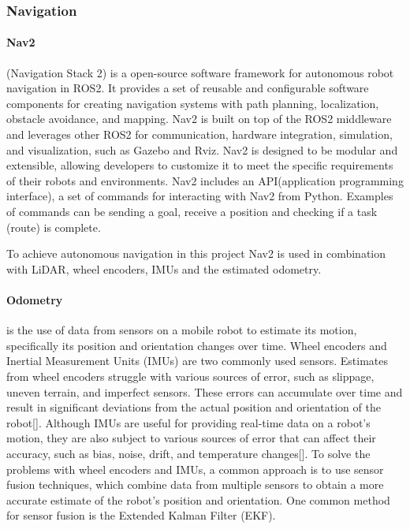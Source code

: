 \subsubsection{Navigation} 

\paragraph{Nav2} (Navigation Stack 2) \cite{rosnavigation} is a open-source software framework for autonomous robot navigation in ROS2. It provides a set of reusable and configurable software components for creating navigation systems with path planning, localization, obstacle avoidance, and mapping. Nav2 is built on top of the ROS2 middleware and leverages other ROS2 for communication, hardware integration, simulation, and visualization, such as Gazebo and Rviz. Nav2 is designed to be modular and extensible, allowing developers to customize it to meet the specific requirements of their robots and environments.
Nav2 includes an API(application programming interface)\cite{rosnavAPI}, a set of commands for interacting with Nav2 from Python. Examples of commands can be sending a goal, receive a position and checking if a task (route) is complete.  

To achieve autonomous navigation in this project Nav2 is used in combination with LiDAR, wheel encoders, IMUs and the estimated odometry. 

\paragraph{Odometry} is the use of data from sensors on a mobile robot to estimate its motion, specifically its position and orientation changes over time. Wheel encoders and Inertial Measurement Units (IMUs) are two commonly used sensors. Estimates from wheel encoders struggle with various sources of error, such as slippage, uneven terrain, and imperfect sensors. These errors can accumulate over time and result in significant deviations from the actual position and orientation of the robot[]. Although IMUs are useful for providing real-time data on a robot's motion, they are also subject to various sources of error that can affect their accuracy, such as bias, noise, drift, and temperature changes[]. 
To solve the problems with wheel encoders and IMUs, a common approach is to use sensor fusion techniques, which combine data from multiple sensors to obtain a more accurate estimate of the robot's position and orientation. One common method for sensor fusion is the Extended Kalman Filter (EKF). 

